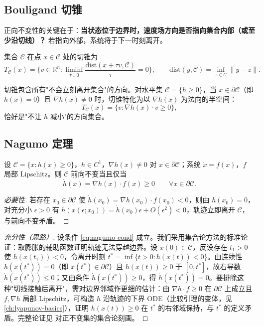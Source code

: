 \subsection{Bouligand 切锥}

正向不变性的关键在于：\textbf{当状态位于边界时，速度场方向是否指向集合内部（或至少沿切线）？} 若指向外部，系统将于下一时刻离开。

\begin{definition}[Bouligand 切锥]\label{def:tangent-cone}
集合 $\mathcal C$ 在点 $x\in\mathcal C$ 处的切锥为
\[
T_{\mathcal C}(x)=\Big\{v\in\mathbb R^n:\liminf_{\tau\downarrow0}\frac{\mathrm{dist}(x+\tau v,\mathcal C)}{\tau}=0\Big\},\qquad \mathrm{dist}(y,\mathcal C)=\inf_{z\in\mathcal C}\|y-z\|.
\]
\end{definition}

切锥包含所有"不会立刻离开集合"的方向。对水平集 $\mathcal C=\{h\ge0\}$，当 $x\in\partial\mathcal C$（即 $h(x)=0$）且 $\nabla h(x)\neq0$ 时，切锥特化为以 $\nabla h(x)$ 为法向的半空间：
\begin{equation}
T_{\mathcal C}(x)=\{v:\nabla h(x)\cdot v\ge0\},
\label{eq:tangent-levelset}
\end{equation}
恰好是"不让 $h$ 减小"的方向集合。

\subsection{Nagumo 定理}

\begin{theorem}\label{thm:nagumo}
设 $\mathcal C=\{x:h(x)\ge0\}$，$h\in C^1$，$\nabla h(x)\neq0$ 对 $x\in\partial\mathcal C$；系统 $\dot x=f(x)$，$f$ 局部 Lipschitz。则 $\mathcal C$ 前向不变当且仅当
\begin{equation}
\dot h(x)=\nabla h(x)\cdot f(x)\ge0\qquad\forall x\in\partial\mathcal C.
\label{eq:nagumo-cond}
\end{equation}
\end{theorem}

\begin{proof}[必要性]
若存在 $x_0\in\partial\mathcal C$ 使 $\dot h(x_0)=\nabla h(x_0)\cdot f(x_0)<0$，则由 $h(x_0)=0$，对充分小 $\epsilon>0$ 有 $h(x(\epsilon;x_0))=\dot h(x_0)\epsilon+O(\epsilon^2)<0$，轨迹立即离开 $\mathcal C$，与前向不变矛盾。
\end{proof}

\begin{proof}[充分性（思路）]
设条件 \cref{eq:nagumo-cond} 成立。我们采用集合论方法的标准论证：取膨胀的辅助函数证明轨迹无法穿越边界。设 $x(0)\in\mathcal C$，反设存在 $t_1>0$ 使 $h(x(t_1))<0$，令离开时刻 $t^*=\inf\{t>0:h(x(t))<0\}$。由连续性 $h(x(t^*))=0$（即 $x(t^*)\in\partial\mathcal C$）且 $h(x(t))\ge0$ 于 $[0,t^*]$，故右导数 $\dot h(x(t^*))\le0$；又由条件 $\dot h(x(t^*))\ge0$，得 $\dot h(x(t^*))=0$。要排除这种"切线接触后离开"，需对边界邻域作更细的估计：由 $\nabla h\cdot f\ge0$ 在 $\partial\mathcal C$ 上成立且 $f,\nabla h$ 局部 Lipschitz，可构造 $h$ 沿轨迹的下界 ODE（比较引理的变体，见 \cref{ch:lyapunov-basics}），证明 $h(x(t))\ge0$ 在 $t^*$ 的右邻域保持，与 $t^*$ 的定义矛盾。完整论证见 \cite{blanchini1999survey} 对正不变集的集合论刻画。
\end{proof}

